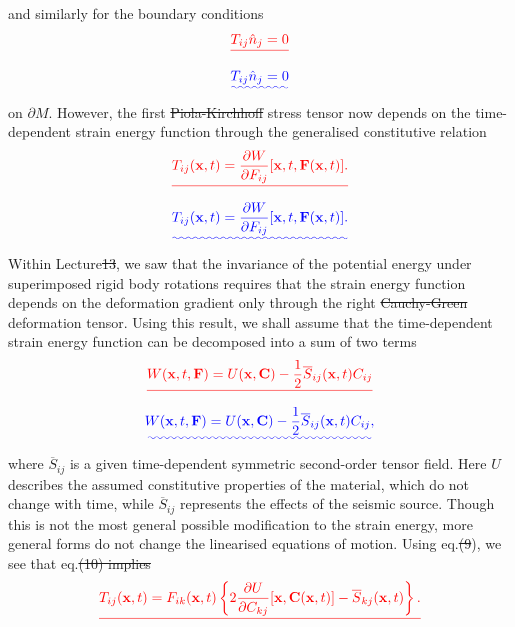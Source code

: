 \documentclass [a4paper,12pt]{paper}
\providecommand{\DIFadd}[1]{{\protect\color{blue}\uwave{#1}}} %
\providecommand{\DIFdel}[1]{{\protect\color{red}\sout{#1}}}                      %
\providecommand{\DIFaddbegin}{} %
\providecommand{\DIFaddend}{} %
\providecommand{\DIFdelbegin}{} %
\providecommand{\DIFdelend}{} %
\begin{document}
and similarly for the boundary conditions
\DIFdelbegin \begin{displaymath}
\DIFdel{T_{ij}\hat{n}_{j} = 0
}\end{displaymath}%
\DIFdelend \DIFaddbegin \begin{equation}\DIFadd{\label{eq:8}
T_{ij}\hat{n}_{j} = 0
}\end{equation}\DIFaddend 
on $\partial M$. However, the first \DIFdelbegin \DIFdel{Piola-Kirchhoff }\DIFdelend \DIFaddbegin \DIFadd{Piola--Kirchhoff }\DIFaddend stress tensor now depends on the time-dependent strain energy function through the 
generalised constitutive relation
\DIFdelbegin \begin{displaymath}
\DIFdel{T_{ij}(\mathbf{x}, t) = \frac{\partial W}{\partial F_{ij}}[\mathbf{x}, t, \mathbf{F}(\mathbf{x}, t)].
}\end{displaymath}%
\DIFdelend \DIFaddbegin \begin{equation}\DIFadd{\label{eq:9}
T_{ij}(\mathbf{x}, t) = \frac{\partial W}{\partial F_{ij}}[\mathbf{x}, t, \mathbf{F}(\mathbf{x}, t)].
}\end{equation}\DIFaddend 
Within Lecture\DIFdelbegin \DIFdel{13}\DIFdelend \DIFaddbegin \DIFadd{~14}\DIFaddend , we saw that the invariance of the potential energy under superimposed rigid body rotations requires that the strain 
energy function depends on the deformation gradient only through the right 
\DIFdelbegin \DIFdel{Cauchy-Green }\DIFdelend \DIFaddbegin \DIFadd{Cauchy--Green }\DIFaddend deformation tensor. Using this result, we shall assume that the time-dependent strain energy function can be decomposed 
into a sum of two terms\DIFdelbegin \begin{displaymath}
\DIFdel{W(\mathbf{x}, t, \mathbf{F}) = U(\mathbf{x}, \mathbf{C}) - \frac{1}{2}\overline{S}_{ij}(\mathbf{x}, t)C_{ij}
}\end{displaymath}%
\DIFdelend \DIFaddbegin \DIFadd{,
}\begin{equation}\DIFadd{\label{eq:10}
W(\mathbf{x}, t, \mathbf{F}) = U(\mathbf{x}, \mathbf{C}) - \frac{1}{2}\overline{S}_{ij}(\mathbf{x}, t)C_{ij},
}\end{equation}\DIFaddend 
where $\overline{S}_{ij}$ is a given time-dependent symmetric second-order tensor field. Here $U$ describes the assumed constitutive 
properties of the material, which do not change with time, while $\overline{S}_{ij}$ represents the effects of the seismic source. 
Though this is not the most general possible modification to the strain energy,
more general forms do not change the linearised equations of motion. Using eq.\DIFdelbegin \DIFdel{(9}\DIFdelend \DIFaddbegin \DIFadd{~(\ref{eq:9}}\DIFaddend ), we see that eq.\DIFdelbegin \DIFdel{(10) implies
}\begin{displaymath}
\DIFdel{T_{ij}(\mathbf{x}, t) = F_{ik}(\mathbf{x}, t)\left\{2\frac{\partial U}{\partial C_{kj}}[\mathbf{x}, \mathbf{C}(\mathbf{x}, t)] - 
\overline{S}_{kj}(\mathbf{x}, t)\right\}.
}\end{displaymath}%
\end{document}
